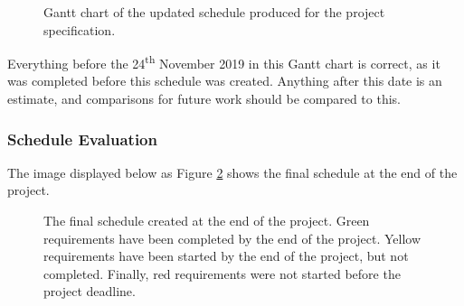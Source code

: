 \documentclass{article}
\begin{document}
\begin{figure}[H]
	\centering
	\caption{Gantt chart of the updated schedule produced for the project specification.}
	\label{figure:progressReportGanttChart}
\end{figure}

Everything before the 24\textsuperscript{th} November 2019 in this Gantt chart is correct, as it was completed before this schedule was created. Anything after this date is an estimate, and comparisons for future work should be compared to this. \par

\subsubsection{Schedule Evaluation}

The image displayed below as Figure \ref{figure:finalSchedule} shows the final schedule at the end of the project. \par

\begin{figure}[H]
	\centering
	\caption{The final schedule created at the end of the project. Green requirements have been completed by the end of the project. Yellow requirements have been started by the end of the project, but not completed. Finally, red requirements were not started before the project deadline.}
	\label{figure:finalSchedule}
\end{figure} 
\end{document}
